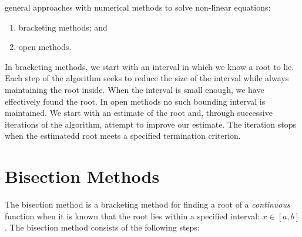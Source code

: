  general approaches with numerical methods to solve non-linear equations:
\begin{enumerate}
\item bracketing methods; and
\item open methods.
\end{enumerate}
In bracketing methods, we start with an interval in which we know a root to lie.  Each step of the algorithm seeks to reduce the size of the interval while always maintaining the root inside.  When the interval is small enough, we have effectively found the root.  In open methods no such bounding interval is maintained.  We start with an estimate of the root and, through successive iterations of the algorithm, attempt to improve our estimate.  The iteration stops when the estimatedd root meets a specified termination criterion.  

\section{Bisection Methods}
The bisection method is a bracketing method for finding a root of a \emph{continuous} function when it is known that the root lies within a specified interval: $x \in [a,b]$.  The bisection method consists of the following steps:

